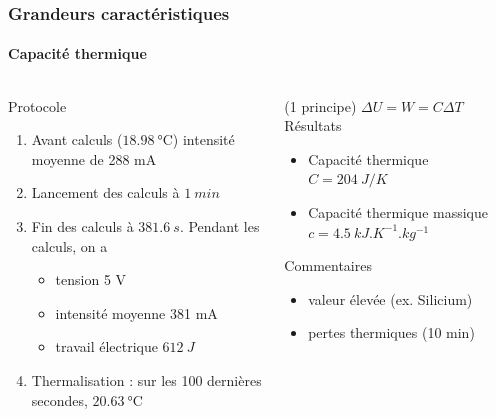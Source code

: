 \documentclass[a4paper,11pt]{beamer}
\newcommand{\cel}{\degreeCelsius}
\begin{document}
\begin{frame}
    \frametitle{Grandeurs caractéristiques}
    \framesubtitle{Capacité thermique}

    \begin{columns}
        \begin{column}{0.5\textwidth}
            Protocole
            \begin{enumerate}
                \item Avant calculs ($\SI{18,98}{\cel}$) intensité moyenne de 288 mA
                \item Lancement des calculs à $\SI{1}{min}$
                \item Fin des calculs à $\SI{381,6}{s}$. Pendant les calculs, on a
                \begin{itemize}
                    \item tension 5 V
                    \item intensité moyenne 381 mA
                    \item travail électrique $\SI{612}{J}$
                \end{itemize}
                \item Thermalisation : sur les 100 dernières secondes, $\SI{20,63}{\cel}$
            \end{enumerate}
        \end{column}
        \vrule{}
        \begin{column}{0.5\textwidth}
            (1\ier{} principe) $\Delta U = W = C \Delta T$
            Résultats
            \begin{itemize}
                \item Capacité thermique $C = \SI{204}{J/K}$
                \item Capacité thermique massique $c = \SI{4,5}{kJ.K^{-1}.kg^{-1}}$
            \end{itemize}
            Commentaires
            \begin{itemize}
                \item valeur élevée (ex. Silicium)
                \item pertes thermiques (10 min)
            \end{itemize}
        \end{column}
    \end{columns}
\end{frame}
\end{document}
